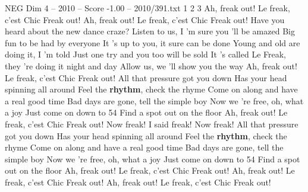 \begin{textsample}{NEG Dim 4 – 2010 – Score -1.00 – 2010/391.txt}  \label{ex:f4_neg_020}
1 2 3 Ah, freak out!
Le freak, c'est Chic Freak out!
Ah, freak out!
Le freak, c'est Chic Freak out!
Have you heard about the new dance craze?
Listen to us, I 'm sure you 'll be amazed Big fun to be had by everyone It 's up to you, it sure can be done Young and old are doing it, I 'm told Just one try and you too will be sold It 's called Le Freak, they 're doing it night and day Allow us, we 'll show you the way Ah, freak out!
Le freak, c'est Chic Freak out!
All that pressure got you down Has your head spinning all around Feel the \textbf{rhythm}, check the rhyme Come on along and have a real good time Bad days are gone, tell the simple boy Now we 're free, oh, what a joy Just come on down to 54 Find a spot out on the floor Ah, freak out!
Le freak, c'est Chic Freak out!
Now freak!
I said freak!
Now freak!
All that pressure got you down Has your head spinning all around Feel the \textbf{rhythm}, check the rhyme Come on along and have a real good time Bad days are gone, tell the simple boy Now we 're free, oh, what a joy Just come on down to 54 Find a spot out on the floor Ah, freak out!
Le freak, c'est Chic Freak out!
Ah, freak out!
Le freak, c'est Chic Freak out!
Ah, freak out!
Le freak, c'est Chic Freak out!

\end{textsample}
